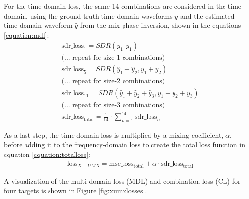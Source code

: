 \documentclass[report.tex]{subfiles}
\begin{document}
For the time-domain loss, the same 14 combinations are considered in the time-domain, using the ground-truth time-domain waveforms $y$ and the estimated time-domain waveform $\hat{y}$ from the mix-phase inversion, shown in the equations \eqref{equation:mdl}:
\begin{align}\tag{35}\label{equation:mdl}
	\nonumber & \text{sdr\_loss}_{1} = \mathit{SDR}(\hat{y}_{1}, y_{1})\\
	\nonumber & \text{(... repeat for size-1 combinations)}\\
	\nonumber & \text{sdr\_loss}_{5} = \mathit{SDR}(\hat{y}_{1} + \hat{y}_{2}, y_{1} + y_{2})\\
	\nonumber & \text{(... repeat for size-2 combinations)}\\
	\nonumber & \text{sdr\_loss}_{11} = \mathit{SDR}(\hat{y}_{1} + \hat{y}_{2} + \hat{y}_{3}, y_{1} + y_{2} + y_{3})\\
	\nonumber & \text{(... repeat for size-3 combinations)}\\
	\nonumber & \text{sdr\_loss}_{\text{total}} = \frac{1}{14} \cdot \sum_{n = 1}^{14}{\text{sdr\_loss}_{n}}
\end{align}

As a last step, the time-domain loss is multiplied by a mixing coefficient, $\alpha$, before adding it to the frequency-domain loss to create the total loss function in equation \eqref{equation:totalloss}:
\begin{align}\tag{36}\label{equation:totalloss}
	\nonumber & \text{loss}_{X-UMX} = \text{mse\_loss}_{\text{total}} + \alpha \cdot \text{sdr\_loss}_{\text{total}}
\end{align}

A visualization of the multi-domain loss (MDL) and combination loss (CL) for four targets is shown in Figure \ref{fig:xumxlosses}.
\end{document}

